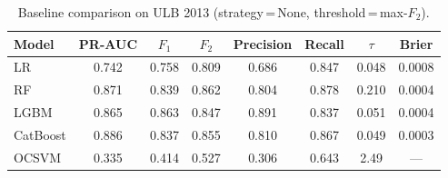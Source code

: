 \begin{table}[ht]
\centering
\caption{Baseline comparison on ULB 2013 (strategy\,=\,None, threshold\,=\,max-$F_2$).}
\label{tab:baseline_ulb}
\begin{tabular}{l c c c c c c c}
\toprule
Model & PR-AUC & $F_1$ & $F_2$ & Precision & Recall & $\tau$ & Brier \\
\midrule
LR         & 0.742 & 0.758 & 0.809 & 0.686 & 0.847 & 0.048 & 0.0008 \\
RF         & 0.871 & 0.839 & 0.862 & 0.804 & 0.878 & 0.210 & 0.0004 \\
LGBM       & 0.865 & 0.863 & 0.847 & 0.891 & 0.837 & 0.051 & 0.0004 \\
CatBoost   & 0.886 & 0.837 & 0.855 & 0.810 & 0.867 & 0.049 & 0.0003 \\
OCSVM      & 0.335 & 0.414 & 0.527 & 0.306 & 0.643 & 2.49 & --- \\
\bottomrule
\end{tabular}
\end{table}